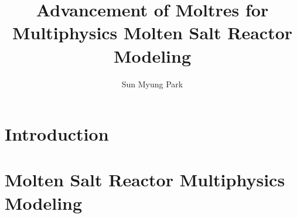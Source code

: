 \documentclass[edeposit,fullpage,11pt]{uiucthesis2021}
\title{Advancement of Moltres for Multiphysics Molten Salt Reactor Modeling}
\author{Sun Myung Park}
\begin{document}
\maketitle

\frontmatter
\begin{abstract}

%

\end{abstract}

\begin{dedication}

\end{dedication}

\begin{acknowledgments}

%

\end{acknowledgments}


{
  \hypersetup{linkcolor=black}
  \tableofcontents
}

\printglossary[title=List of Abbreviations,type=\acronymtype,nonumberlist,
nogroupskip=true]

\pagebreak
\mainmatter
\glsresetall

\chapter{Introduction}
\label{chap:intro}
%
\glsresetall

\chapter{Molten Salt Reactor Multiphysics Modeling}
\label{chap:lit}

\glsresetall
\end{document}
